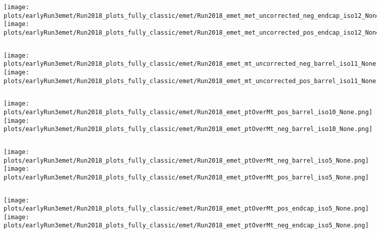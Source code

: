 \documentclass[en,16:9,navbarinfooter]{presentation/sdqbeamer}
\begin{document}
\begin{frame}{\insertsubsection}
   \begin{columns}
   \texttt{[image: plots/earlyRun3emet/Run2018\_plots\_fully\_classic/emet/Run2018\_emet\_met\_uncorrected\_neg\_endcap\_iso12\_None.png]}
   \texttt{[image: plots/earlyRun3emet/Run2018\_plots\_fully\_classic/emet/Run2018\_emet\_met\_uncorrected\_pos\_endcap\_iso12\_None.png]}
\end{columns}
\end{frame}

\begin{frame}{\insertsubsection}
   \begin{columns}
   \texttt{[image: plots/earlyRun3emet/Run2018\_plots\_fully\_classic/emet/Run2018\_emet\_mt\_uncorrected\_neg\_barrel\_iso11\_None.png]}
   \texttt{[image: plots/earlyRun3emet/Run2018\_plots\_fully\_classic/emet/Run2018\_emet\_mt\_uncorrected\_pos\_barrel\_iso11\_None.png]}
\end{columns}
\end{frame}

\begin{frame}{\insertsubsection}
   \begin{columns}
   \texttt{[image: plots/earlyRun3emet/Run2018\_plots\_fully\_classic/emet/Run2018\_emet\_ptOverMt\_pos\_barrel\_iso10\_None.png]}
   \texttt{[image: plots/earlyRun3emet/Run2018\_plots\_fully\_classic/emet/Run2018\_emet\_ptOverMt\_neg\_barrel\_iso10\_None.png]}
\end{columns}
\end{frame}

\begin{frame}{\insertsubsection}
   \begin{columns}
   \texttt{[image: plots/earlyRun3emet/Run2018\_plots\_fully\_classic/emet/Run2018\_emet\_ptOverMt\_neg\_barrel\_iso5\_None.png]}
   \texttt{[image: plots/earlyRun3emet/Run2018\_plots\_fully\_classic/emet/Run2018\_emet\_ptOverMt\_pos\_barrel\_iso5\_None.png]}
\end{columns}
\end{frame}

\begin{frame}{\insertsubsection}
   \begin{columns}
   \texttt{[image: plots/earlyRun3emet/Run2018\_plots\_fully\_classic/emet/Run2018\_emet\_ptOverMt\_pos\_endcap\_iso5\_None.png]}
   \texttt{[image: plots/earlyRun3emet/Run2018\_plots\_fully\_classic/emet/Run2018\_emet\_ptOverMt\_neg\_endcap\_iso5\_None.png]}
\end{columns}
\end{frame}
\end{document}
